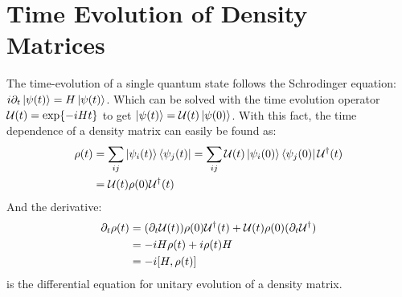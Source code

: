 \section{Time Evolution of Density Matrices} \label{sec: Time Evolution}
The time-evolution of a single quantum state follows the Schrodinger equation: $i\partial_t\ket{\psi(t)} = H\ket{\psi(t)}$. Which can be solved with the time evolution operator $\mathcal{U}(t) = \exp{-iHt}$ to get $\ket{\psi(t)} = \mathcal{U}(t)\ket{\psi(0)}$. With this fact, the time dependence of a density matrix can easily be found as:
\begin{align}
    \rho(t) &= \sum_{ij} \ket{\psi_i(t)}\bra{\psi_j(t)} = \sum_{ij} \mathcal{U}(t) \ket{\psi_i(0)}\bra{\psi_j(0)} \mathcal{U}^\dagger(t) \nonumber \\
    &= \mathcal{U}(t) \rho(0) \mathcal{U}^\dagger(t)
\end{align}
And the derivative:
\begin{align}
    \partial_t \rho(t) &= (\partial_t \unitary(t)) \rho(0)\unitary^\dagger(t) + \unitary(t)\rho(0)(\partial_t \unitary^\dagger) \nonumber \\
    &= -iH \rho(t) +i \rho(t) H \nonumber \\
    &= - i \comm{H}{\rho(t)}
\end{align}
is the differential equation for unitary evolution of a density matrix.\cite{manzano_short_2020}


